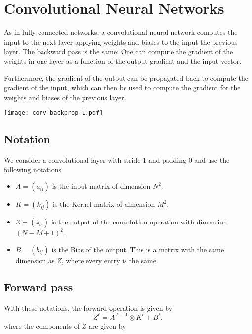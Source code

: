 \documentclass[a4paper,10pt]{article}
\newcommand{\vc}[1]{\boldsymbol{#1}}
\begin{document}

\section{Convolutional Neural Networks}

As in fully connected networks, a convolutional neural network computes the
input to the next layer applying weights and biases to the input the previous
layer. The backward pass is the same: One can compute the gradient of the
weights in one layer as a function of the output gradient and the input vector. 

Furthermore, the gradient of the output can be propagated back to compute the
gradient of the input, which can then be used to compute the gradient for the
weights and biases of the previous layer.

\begin{center}
    \texttt{[image: conv-backprop-1.pdf]}
\end{center}

\subsection*{Notation}

We consider a convolutional layer with stride $1$ and padding $0$ and use the
following notations
\begin{itemize}
    \item $A= (a_{ij})$ is the input matrix of dimension $N^2$.
    \item $K= (k_{ij})$ is the Kernel matrix of dimension $M^2$.
    \item $Z= (z_{ij})$ is the output of the convolution operation with dimension ${(N-M+1)}^2$.
    \item $B= (b_{ij})$ is the Bias of the output. This is a matrix with the same dimension as $Z$, where every entry is the same.
\end{itemize}

\subsection*{Forward pass}

With these notations, the forward operation is given by
\[
    Z^{\ell} = A^{\ell -1} \circledast K^\ell + B^\ell,
\]
where the components of $Z$ are given by
\end{document}
